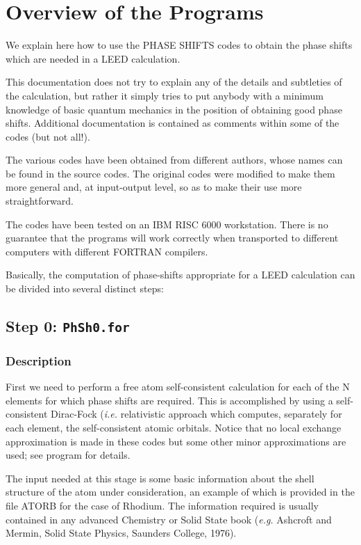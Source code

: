 \documentclass[letterpaper,10pt,english]{sphinxmanual}
\begin{document}
\section{Overview of the Programs}
\label{phshift2007:overview-of-the-programs}
We explain here how to use the PHASE SHIFTS codes to obtain the
phase shifts which are needed in a LEED calculation.

This documentation does not try to explain any of the details and
subtleties of the calculation, but rather it simply tries to put
anybody with a minimum knowledge of basic quantum mechanics in the
position of obtaining good phase shifts. Additional documentation
is contained as comments within some of the codes (but not all!).

The various codes have been obtained from different authors, whose
names can be found in the source codes. The original codes were
modified to make them more general and, at input-output level,
so as to make their use more straightforward.

The codes have been tested on an IBM RISC 6000 workstation. There
is no guarantee that the programs will work correctly when
transported to different computers with different FORTRAN compilers.

Basically, the computation of phase-shifts appropriate for a LEED
calculation can be divided into several distinct steps:


\subsection{Step 0: \texttt{PhSh0.for}}
\label{phshift2007:step-0-phsh0-for}

\subsubsection{Description}
\label{phshift2007:description}
First we need to perform a free atom self-consistent calculation
for each of the N elements for which phase shifts are required.
This is accomplished by using a self-consistent Dirac-Fock (\emph{i.e.}
relativistic approach which computes, separately for each element,
the self-consistent atomic orbitals.
Notice that no local exchange approximation is made in these codes
but some other minor approximations are used; see program for
details.

The input needed at this stage is some basic information about
the shell structure of the atom under consideration, an example
of which is provided in the file ATORB for the case of Rhodium.
The information required is usually contained in any advanced
Chemistry or Solid State book (\emph{e.g.} Ashcroft and Mermin, Solid
State Physics, Saunders College, 1976).
\end{document}
